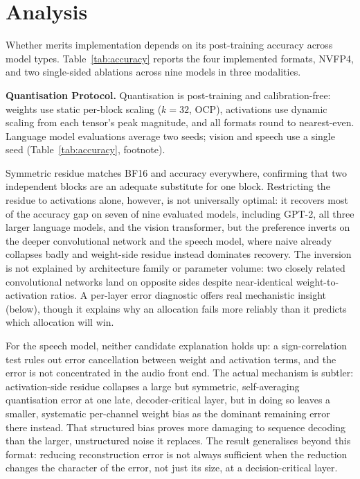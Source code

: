 \section{\fpfourres{} Analysis}
\label{sec:analysis}

Whether \fpfourres{} merits implementation depends on its post-training accuracy across model types. Table~\ref{tab:accuracy} reports the four implemented formats, NVFP4, and two single-sided ablations across nine models in three modalities.

\textbf{Quantisation Protocol.} Quantisation is post-training and calibration-free: weights use static per-block scaling ($k=32$, OCP), activations use dynamic scaling from each tensor's peak magnitude, and all formats round to nearest-even. Language model evaluations average two seeds; vision and speech use a single seed (Table~\ref{tab:accuracy}, footnote).



Symmetric residue matches BF16 and \fpeight{} accuracy everywhere, confirming that two independent \fpfour{} blocks are an adequate substitute for one \fpeight{} block. Restricting the residue to activations alone, however, is not universally optimal: it recovers most of the accuracy gap on seven of nine evaluated models, including GPT-2, all three larger language models, and the vision transformer, but the preference inverts on the deeper convolutional network and the speech model, where naive \fpfour{} already collapses badly and weight-side residue instead dominates recovery. The inversion is not explained by architecture family or parameter volume: two closely related convolutional networks land on opposite sides despite near-identical weight-to-activation ratios. A per-layer error diagnostic offers real mechanistic insight (below), though it explains why an allocation fails more reliably than it predicts which allocation will win.

For the speech model, neither candidate explanation holds up: a sign-correlation test rules out error cancellation between weight and activation terms, and the error is not concentrated in the audio front end. The actual mechanism is subtler: activation-side residue collapses a large but symmetric, self-averaging quantisation error at one late, decoder-critical layer, but in doing so leaves a smaller, systematic per-channel weight bias as the dominant remaining error there instead. That structured bias proves more damaging to sequence decoding than the larger, unstructured noise it replaces. The result generalises beyond this format: reducing reconstruction error is not always sufficient when the reduction changes the character of the error, not just its size, at a decision-critical layer.


